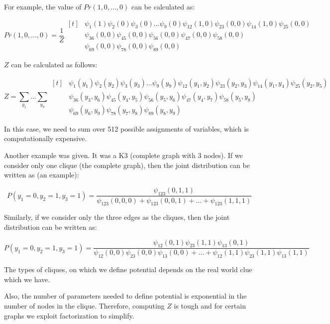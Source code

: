 \documentclass[a4paper,12pt]{article}
\begin{document}
For example, the value of $Pr(1, 0, \dots, 0)$ can be calculated as:

\[
Pr(1, 0, \dots, 0) = \frac{1}{Z} \begin{aligned}[t]
& \psi_1(1) \psi_2(0) \psi_3(0) \dots \psi_9(0) \psi_{12}(1, 0) \psi_{23}(0, 0) \psi_{14}(1, 0) \psi_{25}(0, 0) \\
& \psi_{36}(0, 0) \psi_{45}(0, 0) \psi_{56}(0, 0) \psi_{47}(0, 0) \psi_{58}(0, 0) \\
& \psi_{69}(0, 0) \psi_{78}(0, 0) \psi_{89}(0, 0)
\end{aligned}
\]

$Z$ can be calculated as follows:

\[
Z = \sum_{y_1} \dots \sum_{y_9} \begin{aligned}[t]
& \psi_1(y_1) \psi_2(y_2) \psi_3(y_3) \dots \psi_9(y_9) \psi_{12}(y_1, y_2) \psi_{23}(y_2, y_3) \psi_{14}(y_1, y_4) \psi_{25}(y_2, y_5) \\
& \psi_{36}(y_3, y_6) \psi_{45}(y_4, y_5) \psi_{56}(y_5, y_6) \psi_{47}(y_4, y_7) \psi_{58}(y_5, y_8) \\
& \psi_{69}(y_6, y_9) \psi_{78}(y_7, y_8) \psi_{89}(y_8, y_9) 
\end{aligned}
\]

In this case, we need to sum over 512 possible assignments of variables, which is computationally expensive.


Another example was given. It was a K3 (complete graph with 3 nodes). If we consider only one clique (the complete graph), then the joint distribution can be written as (an example):

\[
    P(y_1 = 0, y_2 = 1, y_3 = 1) = \frac{\psi_{123}(0, 1, 1)}{\psi_{123}(0, 0, 0) + \psi_{123}(0, 0, 1) + \dots + \psi_{123}(1, 1, 1)}
\]

Similarly, if we consider only the three edges as the cliques, then the joint distribution can be written as:

\[
    P(y_1 = 0, y_2 = 1, y_3 = 1) = \frac{\psi_{12}(0, 1) \psi_{23}(1, 1) \psi_{13}(0, 1)}{\psi_{12}(0, 0) \psi_{23}(0, 0) \psi_{13}(0, 0) + \dots + \psi_{12}(1, 1) \psi_{23}(1, 1) \psi_{13}(1, 1)}
\]

The types of cliques, on which we define potential depends on the real world clue which we have. 


Also, the number of parameters needed to define potential is exponential in the number of nodes in the clique. Therefore, computing $Z$ is tough and for certain graphs we exploit factorization to simplify.
\end{document}
